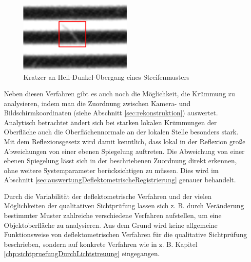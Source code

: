 \begin{figure}[H]
	\centering
	\includegraphics[width=0.5\textwidth]{02_grundlagenDerDeflektometrie/qualitativeSichtpruefung/figures/scratch}
	\caption[Kratzer an Hell-Dunkel-Übergang eines Streifenmusters]{Kratzer an Hell-Dunkel-Übergang eines Streifenmusters}
	\label{img:scratch}
\end{figure}

\noindent
Neben diesen Verfahren gibt es auch noch die Möglichkeit, die Krümmung zu analysieren, indem man die Zuordnung zwischen Kamera- und Bildschirmkoordinaten (siehe Abschnitt \ref{sec:rekonstruktion}) auswertet.
Analytisch betrachtet ändert sich bei starken lokalen Krümmungen der Oberfläche auch die Oberflächennormale an der lokalen Stelle besonders stark.
Mit dem Reflexionsgesetz wird damit kenntlich, dass lokal in der Reflexion große Abweichungen von einer ebenen Spiegelung auftreten.
Die Abweichung von einer ebenen Spiegelung lässt sich in der beschriebenen Zuordnung direkt erkennen, ohne weitere Systemparameter berücksichtigen zu müssen.
Dies wird im Abschnitt \ref{sec:auswertungDeflektometrischeRegistrierung} genauer behandelt.

\p
Durch die Variabilität der deflektometrische Verfahren und der vielen Möglichkeiten der qualitativen Sichtprüfung lassen sich z. B. durch Veränderung bestimmter Muster zahlreiche verschiedene Verfahren aufstellen, um eine Objektoberfläche zu analysieren.
Aus dem Grund wird keine allgemeine Funktionsweise von deflektometrischen Verfahren für die qualitative Sichtprüfung beschrieben, sondern auf konkrete Verfahren wie in z. B. Kapitel \ref{chp:sichtpruefungDurchLichtstreuung} eingegangen.